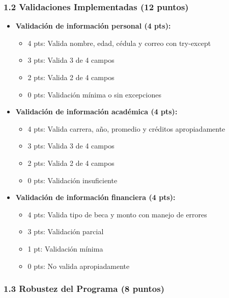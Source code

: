 \documentclass[12pt,a4paper]{article}
\begin{document}
\subsubsection{1.2 Validaciones Implementadas (12 puntos)}

\begin{itemize}[leftmargin=*]
    \item \textbf{Validación de información personal (4 pts):}
    \begin{itemize}
        \item 4 pts: Valida nombre, edad, cédula y correo con try-except
        \item 3 pts: Valida 3 de 4 campos
        \item 2 pts: Valida 2 de 4 campos
        \item 0 pts: Validación mínima o sin excepciones
    \end{itemize}
    
    \item \textbf{Validación de información académica (4 pts):}
    \begin{itemize}
        \item 4 pts: Valida carrera, año, promedio y créditos apropiadamente
        \item 3 pts: Valida 3 de 4 campos
        \item 2 pts: Valida 2 de 4 campos
        \item 0 pts: Validación insuficiente
    \end{itemize}
    
    \item \textbf{Validación de información financiera (4 pts):}
    \begin{itemize}
        \item 4 pts: Valida tipo de beca y monto con manejo de errores
        \item 3 pts: Validación parcial
        \item 1 pt: Validación mínima
        \item 0 pts: No valida apropiadamente
    \end{itemize}
\end{itemize}

\subsubsection{1.3 Robustez del Programa (8 puntos)}
\end{document}
